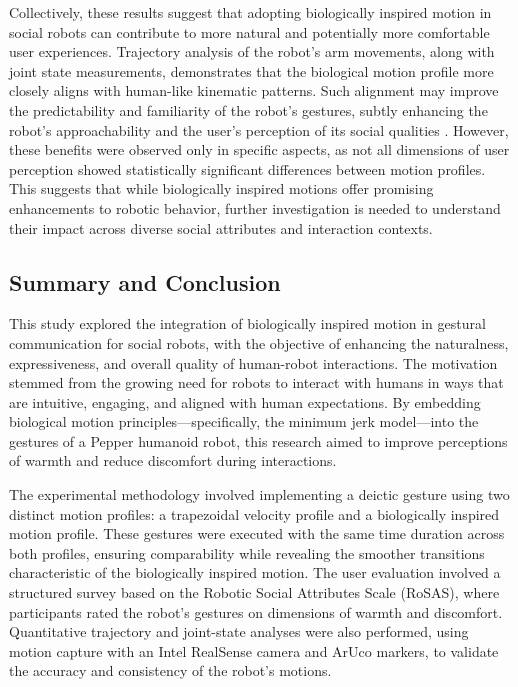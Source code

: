 \documentclass{CSSRforAfrica}
\begin{document}
Collectively, these results suggest that adopting biologically inspired motion in social robots can contribute to more natural and potentially more comfortable user experiences. Trajectory analysis of the robot’s arm movements, along with joint state measurements, demonstrates that the biological motion profile more closely aligns with human-like kinematic patterns. Such alignment may improve the predictability and familiarity of the robot's gestures, subtly enhancing the robot's approachability and the user's perception of its social qualities \cite{Vignoloetal2017}.
However, these benefits were observed only in specific aspects, as not all dimensions of user perception showed statistically significant differences between motion profiles. This suggests that while biologically inspired motions offer promising enhancements to robotic behavior, further investigation is needed to understand their impact across diverse social attributes and interaction contexts.
 

\subsection{Summary and Conclusion}
This study explored the integration of biologically inspired motion in gestural communication for social robots, with the objective of enhancing the naturalness, expressiveness, and overall quality of human-robot interactions. The motivation stemmed from the growing need for robots to interact with humans in ways that are intuitive, engaging, and aligned with human expectations. By embedding biological motion principles—specifically, the minimum jerk model—into the gestures of a Pepper humanoid robot, this research aimed to improve perceptions of warmth and reduce discomfort during interactions.

The experimental methodology involved implementing a deictic gesture using two distinct motion profiles: a trapezoidal velocity profile and a biologically inspired motion profile. These gestures were executed with the same time duration across both profiles, ensuring comparability while revealing the smoother transitions characteristic of the biologically inspired motion. The user evaluation involved a structured survey based on the Robotic Social Attributes Scale (RoSAS), where participants rated the robot's gestures on dimensions of warmth and discomfort. Quantitative trajectory and joint-state analyses were also performed, using motion capture with an Intel RealSense camera and ArUco markers, to validate the accuracy and consistency of the robot’s motions.
\end{document}
